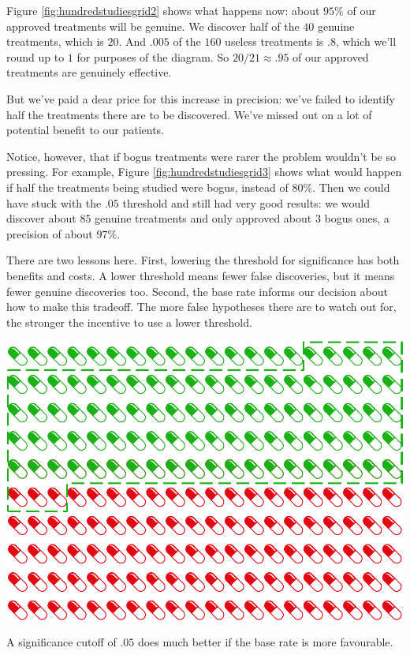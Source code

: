 \documentclass[justified]{tufte-book}
\theoremstyle{definition}
\theoremstyle{definition}
\theoremstyle{definition}
\theoremstyle{remark}
\begin{document}
Figure \ref{fig:hundredstudiesgrid2} shows what happens now: about
\(95\%\) of our approved treatments will be genuine. We discover half of
the \(40\) genuine treatments, which is \(20\). And \(.005\) of the
\(160\) useless treatments is \(.8\), which we'll round up to \(1\) for
purposes of the diagram. So \(20/21 \approx .95\) of our approved
treatments are genuinely effective.

But we've paid a dear price for this increase in precision: we've failed
to identify half the treatments there are to be discovered. We've missed
out on a lot of potential benefit to our patients.

Notice, however, that if bogus treatments were rarer the problem
wouldn't be so pressing. For example, Figure
\ref{fig:hundredstudiesgrid3} shows what would happen if half the
treatments being studied were bogus, instead of \(80\%\). Then we could
have stuck with the \(.05\) threshold and still had very good results:
we would discover about \(85\) genuine treatments and only approved
about \(3\) bogus ones, a precision of about \(97\%\).

There are two lessons here. First, lowering the threshold for
significance has both benefits and costs. A lower threshold means fewer
false discoveries, but it means fewer genuine discoveries too. Second,
the base rate informs our decision about how to make this tradeoff. The
more false hypotheses there are to watch out for, the stronger the
incentive to use a lower threshold.

\begin{marginfigure}
\includegraphics{_main_files/figure-latex/hundredstudiesgrid3-1} \caption[A significance cutoff of $.05$ does much better if the base rate is more favourable]{A significance cutoff of $.05$ does much better if the base rate is more favourable.}\label{fig:hundredstudiesgrid3}
\end{marginfigure}
\end{document}
